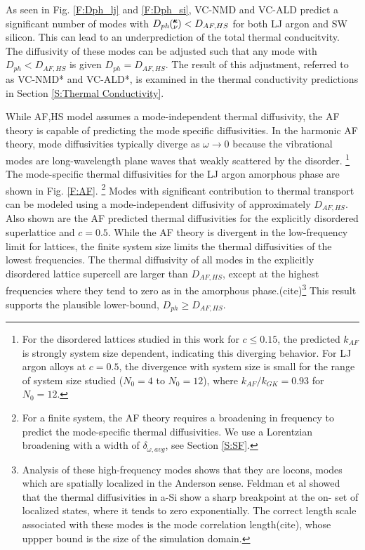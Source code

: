 \documentclass[aps,prb,twocolumn,superscriptaddress,amsmath,amssymb,floatfix]{revtex4}
\newcommand{\kv}{\mspace{-4.0mu}\left(\mspace{-8.0mu}
\begin{smallmatrix}&\pmb{\kappa} \\&\nu\end{smallmatrix}
\mspace{-3.0mu}\right)}
\begin{document}
As seen in Fig. \ref{F:Dph_lj} and \ref{F:Dph_si}, 
VC-NMD and VC-ALD predict a significant 
number of modes with  
$D_{ph}\kv < D_{AF,HS}$ for both LJ argon and SW silicon. 
This can lead to an underprediction of the 
total thermal conducitvity. The diffusivity of these 
modes can be adjusted such that any mode with $D_{ph} < D_{AF,HS}$ is 
given $D_{ph} = D_{AF,HS}$.  The result of this adjustment, 
referred to as VC-NMD* and VC-ALD*, is examined 
in the thermal conductivity predictions in Section 
\ref{S:Thermal Conductivity}.

While AF,HS model assumes a mode-independent thermal diffusivity, 
the AF theory is capable of predicting the mode specific 
diffusivities.\cite{feldman_thermal_1993,feldman_thermal_1993,
feldman_numerical_1999,shenogin_predicting_2009} 
In the harmonic AF theory, mode diffusivities 
typically diverge as $\omega \rightarrow 0$ because
the vibrational modes are long-wavelength plane waves  
that weakly scattered by the disorder.
\cite{sheng_introduction_2006,vitelli_heat_2010}
\footnote[1]
{For the disordered lattices studied 
in this work for $c\le0.15$, the predicted $k_{AF}$ is strongly 
system size dependent, indicating this diverging behavior. 
For LJ argon alloys at $c=0.5$, the divergence with system size is 
small for the range of system size studied ($N_0=4$ to $N_0=12$), 
where $k_{AF}/k_{GK} = 0.93$ for $N_0=12$.} 
The mode-specific thermal diffusivities for the LJ argon amorphous phase 
are shown in Fig. \ref{F:AF}.
\footnote[2]{For a finite system, the AF theory 
requires a broadening in frequency to predict the mode-specific thermal 
diffusivities.  We use a Lorentzian broadening with a width of 
$\delta_{\omega,avg}$, see Section \ref{S:SF}.} 
Modes with significant 
contribution to thermal transport can be modeled using a mode-independent 
diffusivity of approximately $D_{AF,HS}$.  
Also shown are the AF predicted thermal 
diffusivities for the explicitly disordered superlattice and $c=0.5$. 
While the AF theory is divergent in the low-frequency limit for lattices,  
the finite system size limits the thermal diffusivities of the lowest 
frequencies. The thermal diffusivity of all 
modes in the explicitly disordered lattice supercell are 
larger than $D_{AF,HS}$, except 
at the highest frequencies where they tend to zero as in the amorphous 
phase.(cite)\footnote[3]{Analysis of these high-frequency 
modes shows that they are locons, 
modes which are spatially localized in the Anderson sense. 
Feldman et al showed that the thermal 
diffusivities in a-Si show a sharp breakpoint at the on-
set of localized states, where it tends to zero exponentially. 
The correct 
length scale associated with these modes is the mode correlation 
length(cite), whose uppper bound is the size of the simulation domain.} 
This result supports the plausible lower-bound, $D_{ph} \ge D_{AF,HS}$. 
\end{document}
